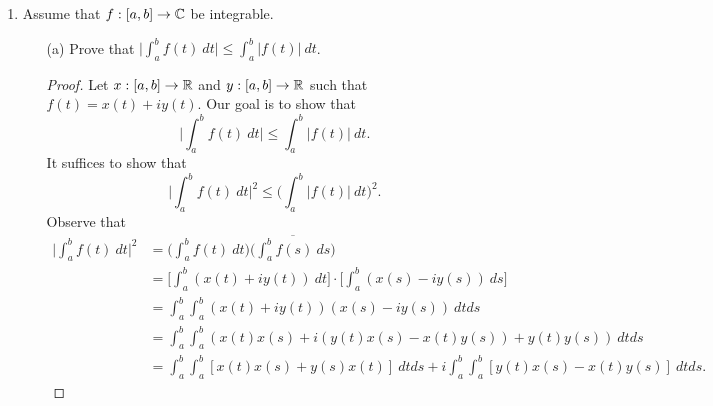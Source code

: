 \documentclass[a4paper]{article}
\begin{document}
\begin{enumerate}
\begin{proof}
        To show that \( f(z) = \overline{\sin z } \) is not holomorphic, we can just show that the real and imaginary parts of \( \overline{\sin z } \) are not constant. By Exercise 6 (a) of homework 5, we see that  
        \[  h(z) = \sin z = \frac{ 1 }{ 2 }  (e^{-y} + e^{y}) \sin x  + i \Big[ - \frac{ 1 }{ 2 }  (e^{-y} + e^{y}) \cos x \Big] \]
        is a holomorphic function on \( \C  \). Note that \( f(z) = \overline{h(z)} \).
        Hence, we see that 
        \[  \overline{\sin z} = \frac{ 1 }{ 2 }  (e^{-y} + e^{y}) \sin x  + i \Big[ \frac{ 1 }{ 2 }  (e^{-y} + e^{y}) \cos x \Big]. \]
        Clearly, both real and imaginary parts of \( h(z) = \overline{\sin z } \) and \( f(z) = \sin z  \) are NOT constant. Hence, \( f(z) = \overline{\sin z } \) is NOT a holomorphic function.   
        \end{proof}
    \item Assume that \( f: [a,b] \to \mathbb{C}  \) be integrable.
        \begin{enumerate}
            \item[(a)] Prove that \( \Big| \int_{ a }^{ b } f(t) \ dt \Big| \leq \int_{ a }^{ b }  | f(t) |  \ dt \).
                \begin{proof}
                    Let \( x: [a,b] \to \mathbb{R}  \) and \( y: [a,b] \to \mathbb{R}  \) such that \( f(t) = x(t) + i y(t) \). Our goal is to show that 
                    \[  \Big| \int_{ a }^{ b }  f(t) \ dt \Big| \leq \int_{ a }^{ b }  | f(t) |  \ dt. \]
                    It suffices to show that 
                \[  \Big| \int_{ a }^{ b } f(t) \ dt \Big|^{2} \leq \Big( \int_{ a }^{ b }  | f(t) | \ dt \Big)^{2}.  \]
                Observe that 
                \begin{align*}
                    \Big| \int_{ a }^{ b }  f(t) \ dt \Big|^{2} &= \Big(  \int_{ a }^{ b }  f(t) \ dt \Big) \overline{\Big(  \int_{ a }^{ b } f(s) \ ds \Big)} \\
                                                                &= \Big[ \int_{ a }^{ b }  (x(t) + i y(t)) \ dt \Big] \cdot \Big[ \int_{ a }^{ b } (x(s) - i y(s)) \ ds \Big] \\
                                                                &= \int_{ a }^{ b } \int_{ a }^{ b }  (x(t) + iy(t) ) (x(s) - i y(s)) \ dt  ds \\
                                                                &= \int_{ a }^{ b }  \int_{ a }^{ b } (x(t) x(s) + i (y(t)x(s) - x(t)y(s)) + y(t)y(s) ) \ dt ds \\
                                                                &= \int_{ a }^{ b }  \int_{ a }^{ b } [x(t) x(s) + y(s) x(t)] \ dt ds + i \int_{ a }^{ b } \int_{ a }^{ b } [y(t) x(s) - x(t) y(s)] \ dt ds.

\end{align*}
\end{proof}
\end{enumerate}
\end{enumerate}
\end{document}
